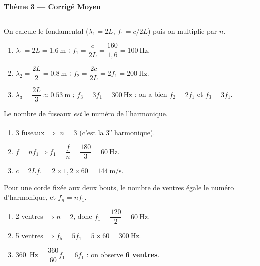 \documentclass[11pt,a4paper]{article}
\begin{document}
\begin{center}
{\large\bfseries\color{excol} Thème 3 — Corrigé Moyen}\\[-2pt]
{\color{excol}\rule{5cm}{1pt}}
\end{center}

\begin{corrige}
On calcule le fondamental ($\lambda_1=2L$, $f_1=c/2L$) puis on multiplie par $n$.
\begin{enumerate}[label=\alph*)]
  \item $\lambda_1=2L=\SI{1.6}{\metre}$ ; $f_1=\dfrac{c}{2L}=\dfrac{160}{1{,}6}=\SI{100}{\hertz}.$
  \item $\lambda_2=\dfrac{2L}{2}=\SI{0.8}{\metre}$ ; $f_2=\dfrac{2c}{2L}=2f_1=\SI{200}{\hertz}.$
  \item $\lambda_3=\dfrac{2L}{3}\approx\SI{0.53}{\metre}$ ; $f_3=3f_1=\SI{300}{\hertz}$ :
        on a bien $f_2=2f_1$ et $f_3=3f_1$.
\end{enumerate}
\end{corrige}

\begin{corrige}
Le nombre de fuseaux \emph{est} le numéro de l'harmonique.
\begin{enumerate}[label=\alph*)]
  \item 3 fuseaux $\Rightarrow$ $n=3$ (c'est la 3\textsuperscript{e} harmonique).
  \item $f=n f_1\Rightarrow f_1=\dfrac{f}{n}=\dfrac{180}{3}=\SI{60}{\hertz}.$
  \item $c=2L f_1=2\times 1{,}2\times 60=\SI{144}{\metre\per\second}.$
\end{enumerate}
\end{corrige}

\begin{corrige}
Pour une corde fixée aux deux bouts, le nombre de ventres égale le numéro d'harmonique, et
$f_n=n f_1$.
\begin{enumerate}[label=\alph*)]
  \item 2 ventres $\Rightarrow n=2$, donc $f_1=\dfrac{120}{2}=\SI{60}{\hertz}.$
  \item 5 ventres $\Rightarrow f_5=5 f_1=5\times 60=\SI{300}{\hertz}.$
  \item \SI{360}{\hertz}$=\dfrac{360}{60}f_1=6 f_1$ : on observe \textbf{6 ventres}.
\end{enumerate}
\end{corrige}
\end{document}

